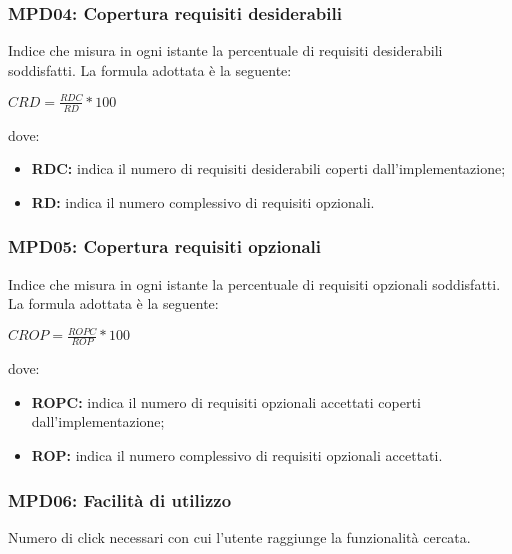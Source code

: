 \subsubsection{MPD04: Copertura requisiti desiderabili}\label{sssec:requisiti_desiderabili}
Indice che misura in ogni istante la percentuale di requisiti desiderabili soddisfatti.
La formula adottata è la seguente:
\begin{center}
    $CRD = \displaystyle \frac{RDC}{RD}*100$
\end{center}
dove:
\begin{itemize}
    \item \textbf{RDC:} indica il numero di requisiti desiderabili coperti dall'implementazione;
    \item \textbf{RD:} indica il numero complessivo di requisiti opzionali.
\end{itemize}

\subsubsection{MPD05: Copertura requisiti opzionali}\label{sssec:requisiti_opzionali}
Indice che misura in ogni istante la percentuale di requisiti opzionali soddisfatti.
La formula adottata è la seguente:
\begin{center}
    $CROP = \displaystyle \frac{ROPC}{ROP}*100$
\end{center}
dove:
\begin{itemize}
    \item \textbf{ROPC:} indica il numero di requisiti opzionali accettati coperti dall'implementazione;
    \item \textbf{ROP:} indica il numero complessivo di requisiti opzionali accettati.
\end{itemize}

\subsubsection{MPD06: Facilità di utilizzo}\label{sssec:facilita_utilizzo}
Numero di click necessari con cui l'utente raggiunge la funzionalità cercata.

